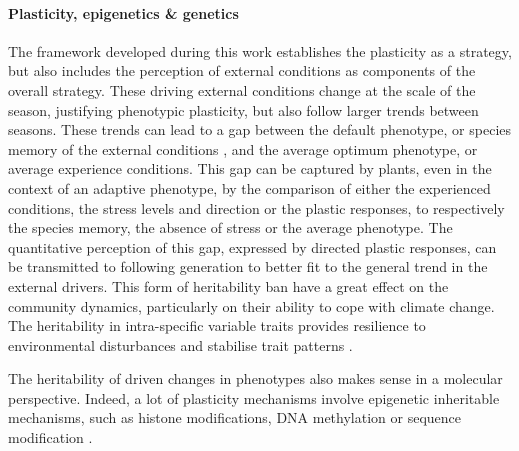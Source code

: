 

\paragraph{Plasticity, epigenetics \& genetics}

The framework developed during this work establishes the plasticity as a strategy, but also includes the perception of external conditions as components of the overall strategy. These driving external conditions change at the scale of the season, justifying phenotypic plasticity, but also follow larger trends between seasons. These trends can lead to a gap between the default phenotype, or species memory of the external conditions , and the average optimum phenotype, or average experience conditions. This gap can be captured by plants, even in the context of an adaptive phenotype, by the comparison of either the experienced conditions, the stress levels and direction or the plastic responses, to respectively the species memory, the absence of stress or the average phenotype. The quantitative perception of this gap, expressed by directed plastic responses, can be transmitted to following generation to better fit to the general trend in the external drivers. This form of heritability ban have a great effect on the community dynamics, particularly on their ability to cope with climate change. The heritability in intra-specific variable traits provides resilience to environmental disturbances and stabilise trait patterns \cite{barabas_effect_2016}.

The heritability of driven changes in phenotypes also makes sense in a molecular perspective. Indeed, a lot of plasticity mechanisms involve epigenetic inheritable mechanisms, such as histone modifications, DNA methylation or sequence modification \cite{nicotra_plant_2010}.

